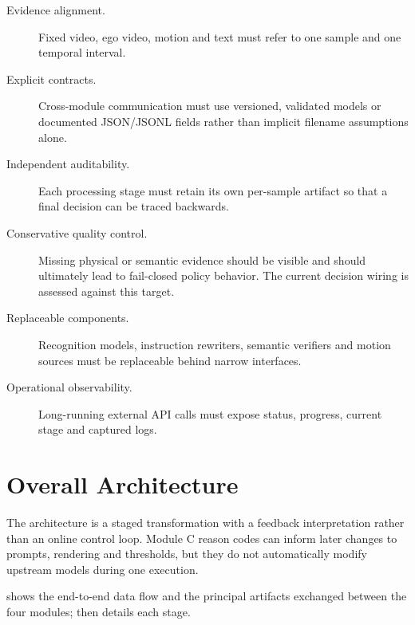 \documentclass[11pt,oneside]{report}
\begin{document}
\begin{description}
    \item[Evidence alignment.] Fixed video, ego video, motion and text must refer
    to one sample and one temporal interval.
    \item[Explicit contracts.] Cross-module communication must use versioned,
    validated models or documented JSON/JSONL fields rather than implicit
    filename assumptions alone.
    \item[Independent auditability.] Each processing stage must retain its own
    per-sample artifact so that a final decision can be traced backwards.
    \item[Conservative quality control.] Missing physical or semantic evidence
    should be visible and should ultimately lead to fail-closed policy behavior.
    The current decision wiring is assessed against this target.
    \item[Replaceable components.] Recognition models, instruction rewriters,
    semantic verifiers and motion sources must be replaceable behind narrow
    interfaces.
    \item[Operational observability.] Long-running external API calls must expose
    status, progress, current stage and captured logs.
\end{description}

\section{Overall Architecture}
The architecture is a staged transformation with a feedback interpretation
rather than an online control loop. Module C reason codes can inform later
changes to prompts, rendering and thresholds, but they do not automatically
modify upstream models during one execution.

 shows the end-to-end data flow and the principal
artifacts exchanged between the four modules; 
then details each stage.
\end{document}
